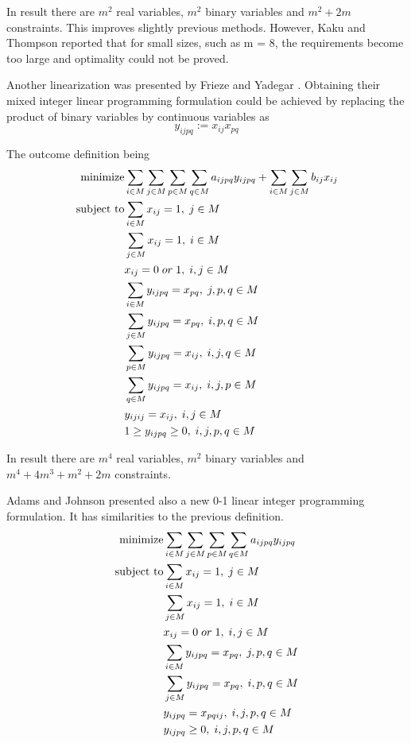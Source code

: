 In result there are $m^2$ real variables, $m^2$ binary variables and $m^2 + 2m$ constraints.
This improves slightly previous methods.
However, Kaku and Thompson \cite{kaku1986exact} reported that for small sizes, such as m = 8, the requirements become too large and optimality could not be proved.

Another linearization was presented by Frieze and Yadegar \cite{frieze1983quadratic}.
Obtaining their mixed integer linear programming formulation could be achieved by replacing the product of binary variables by continuous variables as
\begin{equation}
  y_{ijpq} := x_{ij} x_{pq}
\end{equation}

The outcome definition being
\begin{align}
  \text{minimize} &\null \sum_{i \in M} \sum_{j \in M} \sum_{p \in M} \sum_{q \in M} a_{ijpq}y_{ijpq} + \sum_{i \in M} \sum_{j \in M} b_{ij} x_{ij} \\
  \text{subject to} &\null \sum_{i \in M} x_{ij} = 1, \; j \in M \\
  &\null \sum_{j \in M} x_{ij} = 1, \; i \in M \\
  &\null x_{ij} = 0 \; or \; 1, \; i, j \in M \\
  &\null \sum_{i \in M} y_{ijpq} = x_{pq}, \; j, p, q \in M \\
  &\null \sum_{j \in M} y_{ijpq} = x_{pq}, \; i, p, q \in M \\
  &\null \sum_{p \in M} y_{ijpq} = x_{ij}, \; i, j, q \in M \\
  &\null \sum_{q \in M} y_{ijpq}= x_{ij}, \; i, j, p \in M \\
  &\null y_{ijij} = x_{ij}, \; i, j \in M \\
  &\null 1 \geq y_{ijpq} \geq 0, \; i, j, p, q \in M
\end{align}

In result there are $m^4$ real variables, $m^2$ binary variables and $m^4 + 4m^3+m^2+2m$ constraints.

Adams and Johnson \cite{adams1994improved} presented also a new 0-1 linear integer programming formulation.
It has similarities to the previous definition.
\begin{align}
  \text{minimize} &\null \sum_{i \in M} \sum_{j \in M} \sum_{p \in M} \sum_{q \in M} a_{ijpq}y_{ijpq} \\
  \text{subject to} &\null \sum_{i \in M} x_{ij} = 1, \; j \in M \\
  &\null \sum_{j \in M} x_{ij} = 1, \; i \in M \\
  &\null x_{ij} = 0 \; or \; 1, \; i, j \in M \\
  &\null \sum_{i \in M} y_{ijpq} = x_{pq}, \; j, p, q \in M \\
  &\null \sum_{j \in M} y_{ijpq} = x_{pq}, \; i, p, q \in M \\
  &\null y_{ijpq} = x_{pqij}, \; i, j, p, q \in M \\
  &\null y_{ijpq} \geq 0, \; i, j, p, q \in M
\end{align}

